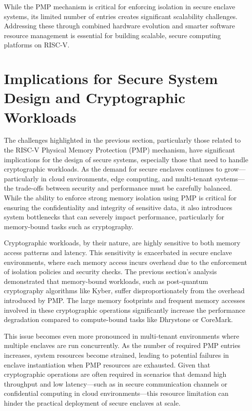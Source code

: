 While the PMP mechanism is critical for enforcing isolation in secure enclave systems, its limited number of entries creates significant scalability challenges. Addressing these through combined hardware evolution and smarter software resource management is essential for building scalable, secure computing platforms on RISC-V.

\section{Implications for Secure System Design and Cryptographic Workloads}
\label{sec:implications}

The challenges highlighted in the previous section, particularly those related to the RISC-V Physical Memory Protection (PMP) mechanism, have significant implications for the design of secure systems, especially those that need to handle cryptographic workloads. As the demand for secure enclaves continues to grow—particularly in cloud environments, edge computing, and multi-tenant systems—the trade-offs between security and performance must be carefully balanced. While the ability to enforce strong memory isolation using PMP is critical for ensuring the confidentiality and integrity of sensitive data, it also introduces system bottlenecks that can severely impact performance, particularly for memory-bound tasks such as cryptography.

Cryptographic workloads, by their nature, are highly sensitive to both memory access patterns and latency. This sensitivity is exacerbated in secure enclave environments, where each memory access incurs overhead due to the enforcement of isolation policies and security checks. The previous section's analysis demonstrated that memory-bound workloads, such as post-quantum cryptography algorithms like Kyber, suffer disproportionately from the overhead introduced by PMP. The large memory footprints and frequent memory accesses involved in these cryptographic operations significantly increase the performance degradation compared to compute-bound tasks like Dhrystone or CoreMark.

This issue becomes even more pronounced in multi-tenant environments where multiple enclaves are run concurrently. As the number of required PMP entries increases, system resources become strained, leading to potential failures in enclave instantiation when PMP resources are exhausted. Given that cryptographic operations are often required in scenarios that demand high throughput and low latency—such as in secure communication channels or confidential computing in cloud environments—this resource limitation can hinder the practical deployment of secure enclaves at scale.

